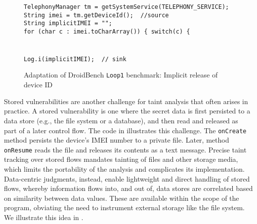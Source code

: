 \begin{figure}
\begin{small}
{\tt TelephonyManager tm = getSystemService(TELEPHONY\_SERVICE);} \\
{\tt String imei = tm.getDeviceId(); {\color{green} //source}} \\
{\tt String implicitIMEI = "";} \\
{\tt for (char c : imei.toCharArray()) \{ switch(c) \{} \\
 \\
 \\
{\tt Log.i(implicitIMEI); {\color{green} // sink}}
\end{small}
\caption{\label{Fi:implicitFlow} Adaptation of DroidBench {\tt Loop1} benchmark: Implicit release of device ID}
\end{figure}

Stored vulnerabilities are another challenge for taint analysis that often arises in practice. A stored vulnerability is one where the secret data is first persisted to a data store (e.g., the file system or a database), and then read and released as part of a later control flow. The code in  illustrates this challenge. The {\tt onCreate} method persists the device's IMEI number to a private file. Later, method {\tt onResume} reads the file and releases its contents as a text message. Precise taint tracking over stored flows mandates tainting of files and other storage media, which limits the portability of the analysis and complicates its implementation. Data-centric judgments, instead, enable lightweight and direct handling of stored flows, whereby information flows into, and out of, data stores are correlated based on similarity between data values. These are available within the scope of the program, obviating the need to instrument external storage like the file system. We illustrate this idea in .

